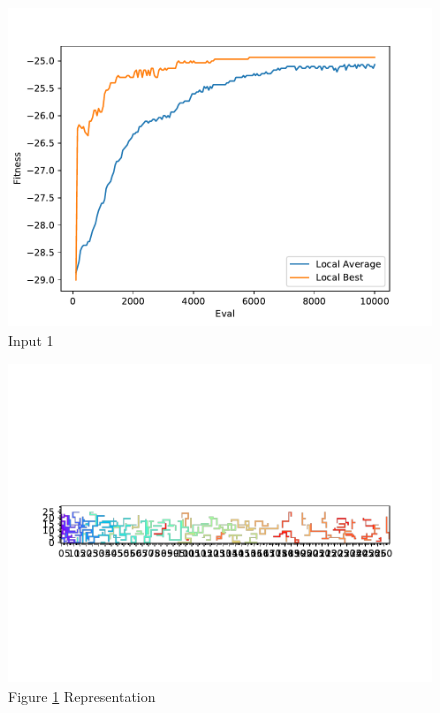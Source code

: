 \documentclass{standalone}
\begin{document}
\begin{figure}[!htb]
	\caption{Input 1}
	\label{fig:graph_1016}
	\includegraphics[width=\textwidth]{../graphs/graphs/1016.pdf}
\end{figure}


\begin{figure}[!htb]
	\caption{Figure \ref{fig:graph_1016} Representation}
	\label{fig:picture_1016}
	\includegraphics[width=\textwidth]{../graphs/picture/1016.pdf}
\end{figure}
\end{document}
